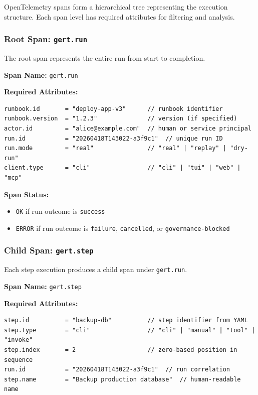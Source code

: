 OpenTelemetry spans form a hierarchical tree representing the execution structure. Each span level has required attributes for filtering and analysis.

\subsubsection{Root Span: \texttt{gert.run}}

The root span represents the entire run from start to completion.

\textbf{Span Name:} \texttt{gert.run}

\textbf{Required Attributes:}
\begin{verbatim}
runbook.id       = "deploy-app-v3"      // runbook identifier
runbook.version  = "1.2.3"              // version (if specified)
actor.id         = "alice@example.com"  // human or service principal
run.id           = "20260418T143022-a3f9c1"  // unique run ID
run.mode         = "real"               // "real" | "replay" | "dry-run"
client.type      = "cli"                // "cli" | "tui" | "web" | "mcp"
\end{verbatim}

\textbf{Span Status:} 
\begin{itemize}
  \item \texttt{OK} if run outcome is \texttt{success}
  \item \texttt{ERROR} if run outcome is \texttt{failure}, \texttt{cancelled}, or \texttt{governance-blocked}
\end{itemize}

\subsubsection{Child Span: \texttt{gert.step}}

Each step execution produces a child span under \texttt{gert.run}.

\textbf{Span Name:} \texttt{gert.step}

\textbf{Required Attributes:}
\begin{verbatim}
step.id          = "backup-db"          // step identifier from YAML
step.type        = "cli"                // "cli" | "manual" | "tool" | "invoke"
step.index       = 2                    // zero-based position in sequence
run.id           = "20260418T143022-a3f9c1"  // run correlation
step.name        = "Backup production database"  // human-readable name
\end{verbatim}

